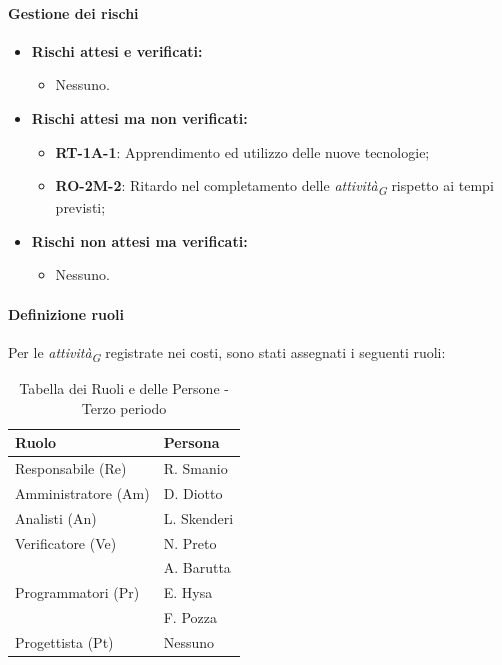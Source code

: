 \paragraph{Gestione dei rischi} 

\begin{itemize}
    \item \textbf{Rischi attesi e verificati:}
\begin{itemize}
    \item Nessuno.
\end{itemize}
\item \textbf{Rischi attesi ma non verificati:}
 \begin{itemize}
    \item \textbf{RT-1A-1}: Apprendimento ed utilizzo delle nuove tecnologie;
    \item \textbf{RO-2M-2}: Ritardo nel completamento delle \textit{attività}\textsubscript{\textit{G}} rispetto ai tempi previsti;
\end{itemize}
\item \textbf{Rischi non attesi ma verificati:}
\begin{itemize}
    \item Nessuno.
\end{itemize}
\end{itemize}
\paragraph{Definizione ruoli} \hspace{1pt}
Per le \textit{attività}\textsubscript{\textit{G}} registrate nei costi, sono stati assegnati i seguenti ruoli:  

\begin{table}[H]
    \centering
    \begin{tabular}{|L{4cm}|L{2cm}|}
    \hline
    \textbf{Ruolo} & \textbf{Persona} \\
    \hline
    \hline
    Responsabile (Re)   & R. Smanio \\
    \hline
    Amministratore (Am) & D. Diotto \\
    \hline
    Analisti (An)       & L. Skenderi \\
    \hline
    Verificatore (Ve)   & N. Preto \\
                        & A. Barutta \\
    \hline
    Programmatori (Pr)  & E. Hysa \\
                        & F. Pozza \\
    \hline
    Progettista (Pt)    & Nessuno \\
    \hline
    \end{tabular}
    \caption{Tabella dei Ruoli e delle Persone - Terzo periodo}
    \label{tab:Ruoli_persone_3}
    \end{table}


